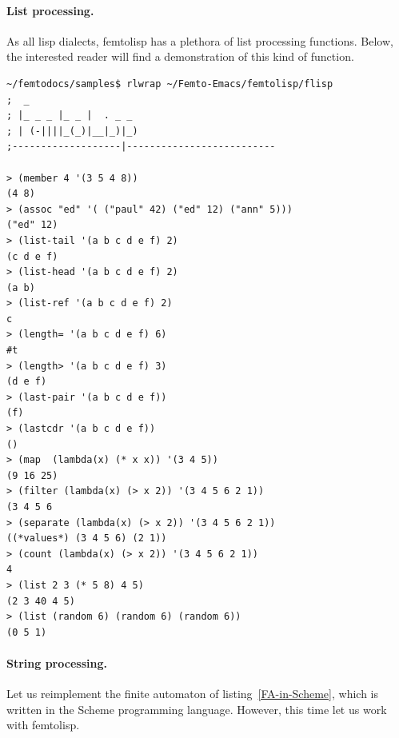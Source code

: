 \documentclass[a4paper,12pt]{book}
\begin{document}
\paragraph{List processing.} As all
lisp dialects, femtolisp has a
plethora of list processing
functions. Below, the interested
reader will find a demonstration
of this kind of function.

\begin{verbatim}
~/femtodocs/samples$ rlwrap ~/Femto-Emacs/femtolisp/flisp
;  _
; |_ _ _ |_ _ |  . _ _
; | (-||||_(_)|__|_)|_)
;-------------------|--------------------------

> (member 4 '(3 5 4 8))
(4 8)
> (assoc "ed" '( ("paul" 42) ("ed" 12) ("ann" 5)))
("ed" 12)
> (list-tail '(a b c d e f) 2)
(c d e f)
> (list-head '(a b c d e f) 2)
(a b)
> (list-ref '(a b c d e f) 2)
c
> (length= '(a b c d e f) 6)
#t
> (length> '(a b c d e f) 3)
(d e f)
> (last-pair '(a b c d e f))
(f)
> (lastcdr '(a b c d e f))
()
> (map  (lambda(x) (* x x)) '(3 4 5))
(9 16 25)
> (filter (lambda(x) (> x 2)) '(3 4 5 6 2 1))
(3 4 5 6
> (separate (lambda(x) (> x 2)) '(3 4 5 6 2 1))
((*values*) (3 4 5 6) (2 1))
> (count (lambda(x) (> x 2)) '(3 4 5 6 2 1))
4
> (list 2 3 (* 5 8) 4 5)
(2 3 40 4 5)
> (list (random 6) (random 6) (random 6))
(0 5 1)
\end{verbatim}

\paragraph{String processing.} Let us
reimplement the finite automaton
of listing~\ref{FA-in-Scheme}, which
is written in the Scheme programming
language. However, this time let us
work with  femtolisp.
\end{document}
